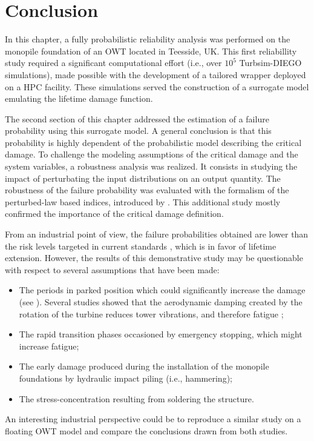 \newpage
\section{Conclusion}

In this chapter, a fully probabilistic reliability analysis was performed on the monopile foundation of an OWT located in Teesside, UK. 
This first reliabillity study required a significant computational effort (i.e., over $10^5$ Turbsim-DIEGO simulations), made possible with the development of a tailored wrapper deployed on a HPC facility. 
These simulations served the construction of a surrogate model emulating the lifetime damage function. 

The second section of this chapter addressed the estimation of a failure probability using this surrogate model. 
A general conclusion is that this probability is highly dependent of the probabilistic model describing the critical damage. 
To challenge the modeling assumptions of the critical damage and the system variables, a robustness analysis was realized. 
It consists in studying the impact of perturbating the input distributions on an output quantity.   
The robustness of the failure probability was evaluated with the formalism of the perturbed-law based indices, introduced by \citet{lemaitre_2015_PLI}.
This additional study mostly confirmed the importance of the critical damage definition. 

From an industrial point of view, the failure probabilities obtained are lower than the risk levels targeted in current standards \citep{wang_2022_owt_reliability_review}, which is in favor of lifetime extension. 
However, the results of this demonstrative study may be questionable with respect to several assumptions that have been made: 
\begin{itemize}
    \item The periods in parked position which could significantly increase the damage (see \citealp{velarde_2020_fatigue_reliability}). 
    Several studies showed that the aerodynamic damping created by the rotation of the turbine reduces tower vibrations, and therefore fatigue \citep{liu_2017_damping};
    \item The rapid transition phases occasioned by emergency stopping, which might increase fatigue;
    \item The early damage produced during the installation of the monopile foundations by hydraulic impact piling (i.e., hammering);  
    \item The stress-concentration resulting from soldering the structure.
\end{itemize} 
An interesting industrial perspective could be to reproduce a similar study on a floating OWT model and compare the conclusions drawn from both studies.  

